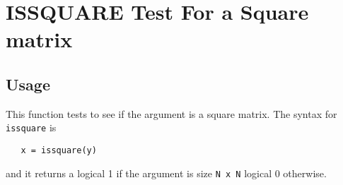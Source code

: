 \section{ISSQUARE Test For a Square matrix
}

\subsection{Usage}

This function tests to see if the argument is a square matrix.  The 
syntax for \verb|issquare| is
\begin{verbatim}
   x = issquare(y)
\end{verbatim}
and it returns a logical 1 if the argument is size \verb|N x N|
logical 0 otherwise.
